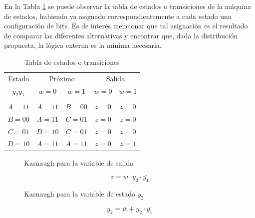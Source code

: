 En la Tabla \ref{table:tabla_estados_ejercicio_2} se puede observar la tabla de estados o transiciones de la m\'aquina de estados, habiendo ya asignado correspondientemente a cada estado una configuraci\'on de bits. Es de inter\'es mencionar
que tal asignaci\'on es el resultado de comparar las diferentes alternativas y encontrar que, dada la distribuci\'on propuesta, la l\'ogica externa es la m\'inima necesaria.

\begin{table}[H]
    \centering
    \begin{tabular}{c  c c  c c}
        Estado & \multicolumn{2}{c}{Pr\'oximo} & \multicolumn{2}{c}{Salida} \\
        $y_2 y_1$ & $w = 0$ & $w = 1$ & $w = 0$ & $w = 1$ \\
        \hline \\
        $A=11$ & $A=11$ & $B=00$ & $z=0$ & $z=0$ \\
        $B=00$ & $A=11$ & $C=01$ & $z=0$ & $z=0$ \\
        $C=01$ & $D=10$ & $C=01$ & $z=0$ & $z=0$ \\
        $D=10$ & $A=11$ & $A=11$ & $z=0$ & $z=1$ \\
        \hline
    \end{tabular}    
    \caption{Tabla de estados o transiciones}
    \label{table:tabla_estados_ejercicio_2}
\end{table}

\begin{figure}[H]
    \centering
    \begin{Karnaughvuit}
    \end{Karnaughvuit}
    \caption{Karnaugh para la variable de salida}
\end{figure}

\begin{equation}
    z = w \cdot y_2 \cdot \overline{y_1}
\end{equation}

\begin{figure}[H]
    \centering
    \begin{Karnaughvuit}
    \end{Karnaughvuit}
    \caption{Karnaugh para la variable de estado $y_2$}
\end{figure}

\begin{equation}
    y_2 = \overline{w} + y_2 \cdot \overline{y_1}
\end{equation}

